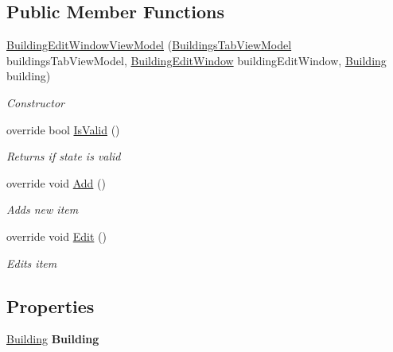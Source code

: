\subsection*{Public Member Functions}
\begin{DoxyCompactItemize}
\item 
\hyperlink{class_baudi_1_1_client_1_1_view_models_1_1_edit_window_view_models_1_1_building_edit_window_view_model_a5ba580cb8b7c79807b188adf534a4057}{Building\+Edit\+Window\+View\+Model} (\hyperlink{class_baudi_1_1_client_1_1_view_models_1_1_tabs_view_models_1_1_buildings_tab_view_model}{Buildings\+Tab\+View\+Model} buildings\+Tab\+View\+Model, \hyperlink{class_baudi_1_1_client_1_1_view_1_1_edit_windows_1_1_building_edit_window}{Building\+Edit\+Window} building\+Edit\+Window, \hyperlink{class_baudi_1_1_d_a_l_1_1_models_1_1_building}{Building} building)
\begin{DoxyCompactList}\small\item\em Constructor \end{DoxyCompactList}\item 
override bool \hyperlink{class_baudi_1_1_client_1_1_view_models_1_1_edit_window_view_models_1_1_building_edit_window_view_model_a037fe91ae03a5a2652cf131509f4f672}{Is\+Valid} ()
\begin{DoxyCompactList}\small\item\em Returns if state is valid \end{DoxyCompactList}\item 
override void \hyperlink{class_baudi_1_1_client_1_1_view_models_1_1_edit_window_view_models_1_1_building_edit_window_view_model_a6b9f9586ef5201dc8a4eee96ad8defc1}{Add} ()
\begin{DoxyCompactList}\small\item\em Adds new item \end{DoxyCompactList}\item 
override void \hyperlink{class_baudi_1_1_client_1_1_view_models_1_1_edit_window_view_models_1_1_building_edit_window_view_model_a67e69fe04463495d6fe4992bcdef29c2}{Edit} ()
\begin{DoxyCompactList}\small\item\em Edits item \end{DoxyCompactList}\end{DoxyCompactItemize}
\subsection*{Properties}
\begin{DoxyCompactItemize}
\item 
\hypertarget{class_baudi_1_1_client_1_1_view_models_1_1_edit_window_view_models_1_1_building_edit_window_view_model_a02f8470302363f47e70fc705850627c5}{}\hyperlink{class_baudi_1_1_d_a_l_1_1_models_1_1_building}{Building} {\bfseries Building}\label{class_baudi_1_1_client_1_1_view_models_1_1_edit_window_view_models_1_1_building_edit_window_view_model_a02f8470302363f47e70fc705850627c5}

\end{DoxyCompactItemize}
